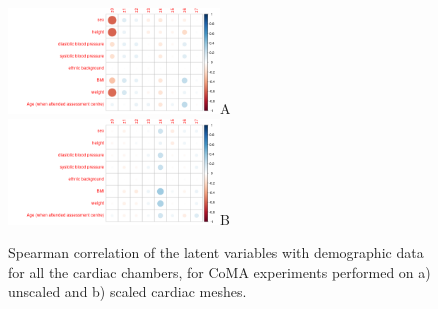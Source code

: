 \begin{figure}[ht!]
\includegraphics[width=0.5\textwidth]{figs/correlation/experiment_2_vs_demographic_data}A
\includegraphics[width=0.5\textwidth]{figs/correlation/experiment_1_vs_demographic_data}B

\caption{Spearman correlation of the latent variables with demographic data for all the cardiac chambers, for CoMA experiments performed on a) unscaled and b) scaled cardiac meshes.}
\label{fig:relation_to_demographic}
\end{figure}




